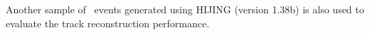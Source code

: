 Another sample of \pbpb\ events generated using HIJING (version 1.38b) \cite{Aad:2010ah} is also used to evaluate the track reconstruction performance.




